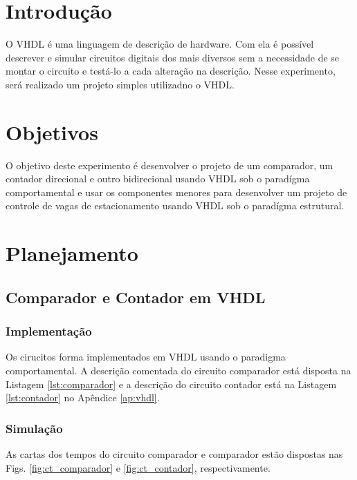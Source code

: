\documentclass[a4,12pt]{horizon-theme}
\begin{document}
\horizonCover

\horizonTitle


\section{Introdução} %
O VHDL é uma linguagem de descrição de hardware. Com ela é possível descrever e simular circuitos digitais dos mais diversos sem a necessidade de se montar o circuito e testá-lo a cada alteração na descrição. Nesse experimento, será realizado um projeto simples utilizadno o VHDL.

\section{Objetivos} %
O objetivo deste experimento é desenvolver o projeto de um comparador, um contador direcional e outro bidirecional usando VHDL sob o paradígma comportamental e usar os componentes menores para desenvolver um projeto de controle de vagas de estacionamento usando VHDL sob o paradígma estrutural.


\section{Planejamento} %
\label{sec:plan}

\subsection{Comparador e Contador em VHDL}
\label{sec:plan_1}

\subsubsection{Implementação}
\label{sec:plan_1_impl}
Os cirucitos forma implementados em VHDL usando o paradigma comportamental. A descrição comentada do circuito comparador está disposta na Listagem \ref{lst:comparador} e a descrição do circuito contador está na Listagem \ref{lst:contador} no Apêndice \ref{ap:vhdl}.


\subsubsection{Simulação}
\label{sec:plan_1_sim}

As cartas dos tempos do circuito comparador e comparador estão dispostas nas Figs. \ref{fig:ct_comparador} e \ref{fig:ct_contador}, respectivamente.
\end{document}
